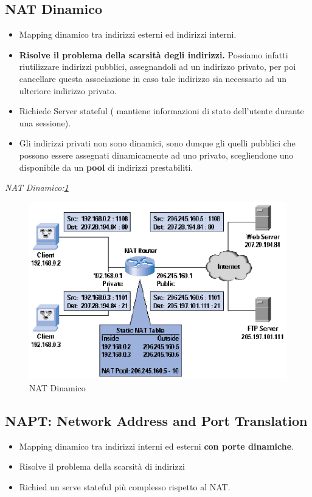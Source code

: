 \documentclass[12pt]{article}
\begin{document}
		\subsection{NAT Dinamico}
			\begin{itemize}
				\item Mapping dinamico tra indirizzi esterni ed indirizzi interni.
				\item \textbf{Risolve il problema della scarsità degli indirizzi.} Possiamo infatti riutilizzare indirizzi pubblici, assegnandoli ad un indirizzo privato, per poi cancellare questa associazione in caso tale indirizzo  sia necessario ad un ulteriore indirizzo privato.
				\item Richiede Server stateful ( mantiene informazioni di stato dell'utente durante una sessione).
				\item Gli indirizzi privati non sono dinamici, sono dunque gli quelli pubblici che possono essere assegnati dinamicamente ad uno privato, scegliendone uno disponibile da un \textbf{pool} di indirizzi prestabiliti.
			\end{itemize}
		\textit{NAT Dinamico:\ref{fig:3}}
		\begin{figure}[h!]
			\centering
			\includegraphics[scale=0.60]{img/dinamic.PNG}
			\caption{NAT Dinamico\label{fig:3}}
		\end{figure}
		
		\subsection{NAPT: Network Address and Port Translation}
			\begin{itemize}
				\item Mapping dinamico tra indirizzi interni ed esterni \textbf{con porte dinamiche}.
				\item Risolve il problema della scarsità di indirizzi
				\item Richied un serve stateful più complesso rispetto al NAT.
			\end{itemize}
			
\end{document}
